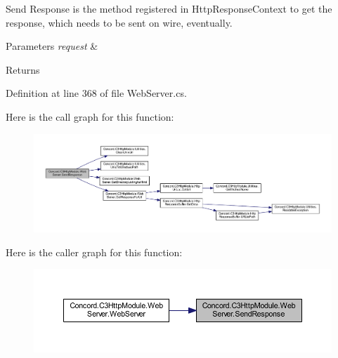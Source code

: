 Send Response is the method registered in Http\+Response\+Context to get the response, which needs to be sent on wire, eventually. 


\begin{DoxyParams}{Parameters}
{\em request} & \\
\hline
\end{DoxyParams}
\begin{DoxyReturn}{Returns}

\end{DoxyReturn}


Definition at line 368 of file Web\+Server.\+cs.

Here is the call graph for this function\+:
\nopagebreak
\begin{figure}[H]
\begin{center}
\leavevmode
\includegraphics[width=350pt]{class_concord_1_1_c3_http_module_1_1_web_server_ac9786f7a42e9d04a8c8bda5ff7caa482_cgraph}
\end{center}
\end{figure}
Here is the caller graph for this function\+:
\nopagebreak
\begin{figure}[H]
\begin{center}
\leavevmode
\includegraphics[width=350pt]{class_concord_1_1_c3_http_module_1_1_web_server_ac9786f7a42e9d04a8c8bda5ff7caa482_icgraph}
\end{center}
\end{figure}
\mbox{\label{class_concord_1_1_c3_http_module_1_1_web_server_ac95e30c39f5d922e6043377ccac20e6d}} 
